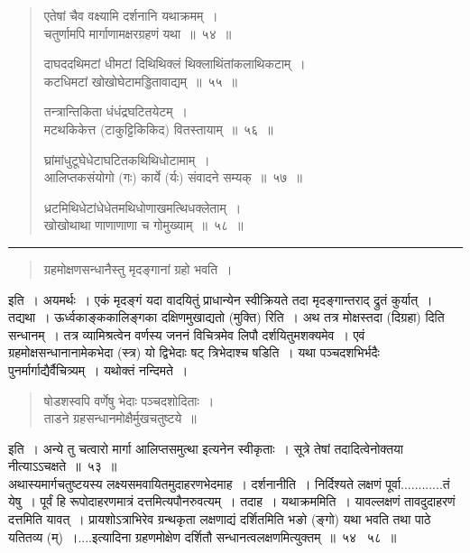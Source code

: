 \documentclass[11pt, openany]{book}
\begin{document}
\newpage

\begin{quote}
{\na  एतेषां चैव वक्ष्यामि दर्शनानि यथाक्रमम्~।\\
 चतुर्णामपि मार्गाणामक्षरग्रहणं यथा~॥~५४~॥

 दाघददथिमटां धीमटां दिथिथिक्लं थिक्लाथिंतांकलाथिकटाम्~।\\
 कटधिमटां खोखोघेटामड्डितावाद्यम्~॥~५५~॥

 तन्त्रान्तिकिता धंधंद्रघटितयेटम्~।\\
 मटथकिकेत्त (टाकुट्टिकिकिद) वितस्तायाम्~॥~५६~॥

 घ्रांमांधुटूघेधेटाघटितकथिथिधोटामाम्~।\\
 आलिप्तकसंयोगो (गः) कार्ये (र्यः) संवादने सम्यक्~॥~५७~॥

 ध्रटमिथिधेटांधेधेतमथिधोणाखमत्थिधक्लेताम्~।\\
 खोखोथाथा णाणाणाणा च गोमुख्याम्~॥~५८~॥}
\end{quote}

\hrule

\begin{quote}
{\qt ग्रहमोक्षणसन्धानैस्तु मृदङ्गानां ग्रहो भवति~।}
\end{quote}

\noindent
इति~। अयमर्थः~। एकं मृदङ्गं यदा वादयितुं प्राधान्येन स्वीक्रियते तदा मृदङ्गान्तराद् द्रुतं कुर्यात्~। तद्यथा~। ऊर्ध्वकाङ्ककालिङ्गका दक्षिणमुखाद्यतो (मुक्ति) रिति~। अथ तत्र मोक्षस्तदा (दिग्रहा) दिति सन्धानम्~। तत्र व्यामिश्रत्वेन वर्णस्य जननं विचित्रमेव लिपौ दर्शयितुमशक्यमेव~। एवं ग्रहमोक्षसन्धानानामेकभेदा (स्त्र) यो द्विभेदाः षट् त्रिभेदाश्च {\qtt षडिति}~। यथा पञ्चदशभिर्भदैः पुनर्मार्गाद्यैर्वैचित्र्यम्~। यथोक्तं {\qtt नन्दिमते}~।

\begin{quote}
{\qt षोडशस्वपि वर्णेषु भेदाः पञ्चदशोदिताः~।\\
 ताडने ग्रहसन्धानमोक्षैर्मुखचतुष्टये~॥}
\end{quote}

\noindent
इति~। अन्ये तु चत्वारो मार्गा आलिप्तसमुत्था इत्यनेन स्वीकृताः~। सूत्रे तेषां तदादित्वेनोक्तया नीत्याऽऽचक्षते~॥~५३~॥\\

अथास्यमार्गचतुष्टयस्य लक्ष्यसमवायितमुदाहरणभेदमाह~। {\qtt दर्शनानीति}~। निर्दिश्यते लक्षणं पूर्वा............तं येषु~। पूर्वं हि रूपोदाहरणमात्रं दत्तमित्यपौनरुवत्यम्~। {\qtt तदाह~। यथाक्रममिति}~। यावल्लक्षणं तावदुदाहरणं दत्तमिति यावत्~। प्रायशोऽत्राभिरेव ग्रन्थकृता लक्षणाद्यं दर्शितमिति भङो (ङ्गो) यथा भवति तथा पाठे यतितव्य (म्)~।....इत्यादिना ग्रहणमोक्षेण दर्शितौ सन्धानत्वलक्षणमित्युक्तम्~॥~५४ \textendash\ ५८~॥
\end{document}
